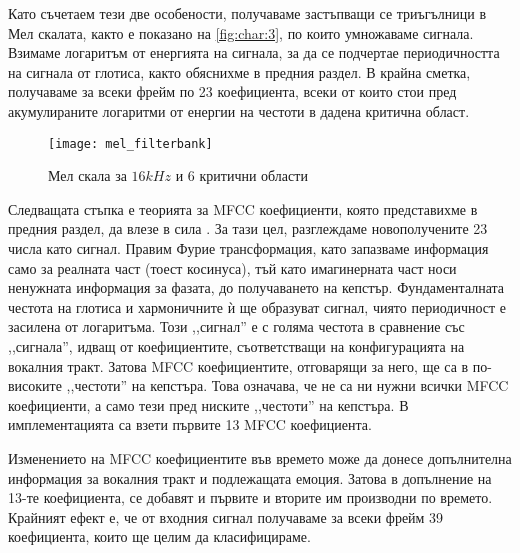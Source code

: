\documentclass[main.tex]{subfiles}
\begin{document}
    Като съчетаем тези две особености, получаваме застъпващи се триъгълници в Мел скалата, както е показано на \autoref{fig:char:3}, по които умножаваме сигнала. Взимаме логаритъм от енергията на сигнала, за да се подчертае периодичността на сигнала от глотиса, както обяснихме в предния раздел.
    В крайна сметка, получаваме за всеки фрейм по 23 коефициента, всеки от които стои пред акумулираните логаритми от енергии на честоти в дадена критична област.

    \begin{figure}[H]
        \centering
        \texttt{[image: mel\_filterbank]}%
        \caption{Мел скала за $16kHz$ и 6 критични области}
        \label{fig:char:3}
    \end{figure}

    Следващата стъпка е теорията за MFCC коефициенти, която представихме в предния раздел, да влезе в сила . За тази цел, разглеждаме новополучените 23 числа като сигнал.  Правим Фурие трансформация, като запазваме информация само за реалната част (тоест косинуса), тъй като имагинерната част носи ненужната информация за фазата, до получаването на кепстър. Фундаменталната честота на глотиса и хармоничните ѝ ще образуват сигнал, чиято периодичност е засилена от логаритъма. Този ,,сигнал'' е с голяма честота в сравнение със ,,сигнала'', идващ от коефициентите, съответстващи на конфигурацията на вокалния тракт. Затова MFCC коефициентите, отговарящи за него, ще са в по-високите ,,честоти'' на кепстъра.
    Това означава, че не са ни нужни всички MFCC коефициенти, а само тези пред ниските ,,честоти'' на кепстъра. В имплементацията са взети първите 13 MFCC коефициента.

    Изменението на MFCC коефициентите във времето може да донесе допълнителна информация за вокалния тракт и подлежащата емоция. Затова в допълнение на 13-те коефициента, се добавят и първите и вторите им производни по времето.
    Крайният ефект е, че от входния сигнал получаваме за всеки фрейм 39 коефициента, които ще целим да класифицираме.
\end{document}
